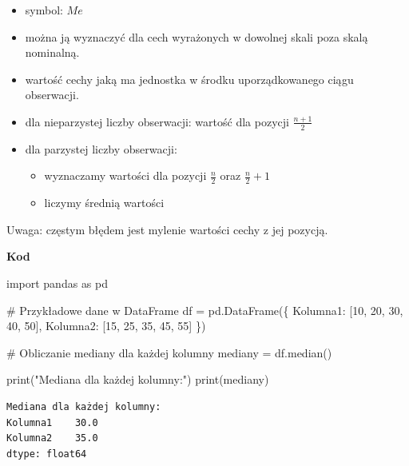 \documentclass[
  polish,
  letterpaper,
  DIV=11,
  numbers=noendperiod]{scrreprt}
\newenvironment{Shaded}{\begin{snugshade}}{\end{snugshade}}
\newcommand{\BuiltInTok}[1]{\textcolor[rgb]{0.00,0.23,0.31}{#1}}
\newcommand{\CommentTok}[1]{\textcolor[rgb]{0.37,0.37,0.37}{#1}}
\newcommand{\DecValTok}[1]{\textcolor[rgb]{0.68,0.00,0.00}{#1}}
\newcommand{\ImportTok}[1]{\textcolor[rgb]{0.00,0.46,0.62}{#1}}
\newcommand{\NormalTok}[1]{\textcolor[rgb]{0.00,0.23,0.31}{#1}}
\newcommand{\OperatorTok}[1]{\textcolor[rgb]{0.37,0.37,0.37}{#1}}
\newcommand{\StringTok}[1]{\textcolor[rgb]{0.13,0.47,0.30}{#1}}
\providecommand{\tightlist}{%
  \setlength{\itemsep}{0pt}\setlength{\parskip}{0pt}}
\begin{document}
\begin{itemize}
\tightlist
\item
  symbol: \(Me\)
\item
  można ją wyznaczyć dla cech wyrażonych w dowolnej skali poza skalą
  nominalną.
\item
  wartość cechy jaką ma jednostka w środku uporządkowanego ciągu
  obserwacji.
\item
  dla nieparzystej liczby obserwacji: wartość dla pozycji
  \(\frac{n+1}{2}\)
\item
  dla parzystej liczby obserwacji:

  \begin{itemize}
  \tightlist
  \item
    wyznaczamy wartości dla pozycji \(\frac{n}{2}\) oraz
    \(\frac{n}{2}+1\)
  \item
    liczymy średnią wartości
  \end{itemize}
\end{itemize}

Uwaga: częstym błędem jest mylenie wartości cechy z jej pozycją.

\textbf{Kod}

\begin{Shaded}
\begin{Highlighting}[]
\ImportTok{import}\NormalTok{ pandas }\ImportTok{as}\NormalTok{ pd}

\CommentTok{\# Przykładowe dane w DataFrame}
\NormalTok{df }\OperatorTok{=}\NormalTok{ pd.DataFrame(\{}
    \StringTok{\textquotesingle{}Kolumna1\textquotesingle{}}\NormalTok{: [}\DecValTok{10}\NormalTok{, }\DecValTok{20}\NormalTok{, }\DecValTok{30}\NormalTok{, }\DecValTok{40}\NormalTok{, }\DecValTok{50}\NormalTok{],}
    \StringTok{\textquotesingle{}Kolumna2\textquotesingle{}}\NormalTok{: [}\DecValTok{15}\NormalTok{, }\DecValTok{25}\NormalTok{, }\DecValTok{35}\NormalTok{, }\DecValTok{45}\NormalTok{, }\DecValTok{55}\NormalTok{]}
\NormalTok{\})}

\CommentTok{\# Obliczanie mediany dla każdej kolumny}
\NormalTok{mediany }\OperatorTok{=}\NormalTok{ df.median()}

\BuiltInTok{print}\NormalTok{(}\StringTok{"Mediana dla każdej kolumny:"}\NormalTok{)}
\BuiltInTok{print}\NormalTok{(mediany)}
\end{Highlighting}
\end{Shaded}

\begin{verbatim}
Mediana dla każdej kolumny:
Kolumna1    30.0
Kolumna2    35.0
dtype: float64
\end{verbatim}
\end{document}
